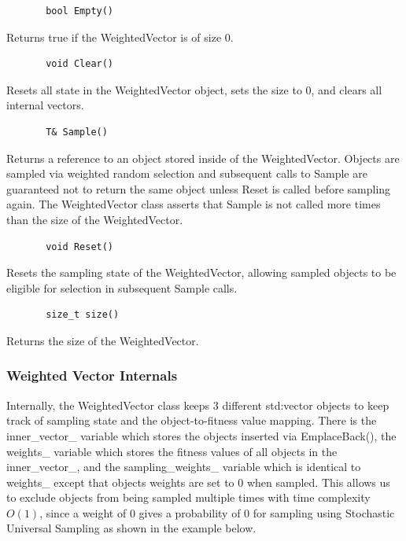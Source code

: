 \documentclass[12pt]{article}
\begin{document}
     \begin{verbatim}
       bool Empty()
     \end{verbatim}

     Returns true if the WeightedVector is of size 0.

     \begin{verbatim}
       void Clear()
     \end{verbatim}

     Resets all state in the WeightedVector object, sets the size to 0, and
     clears all internal vectors.

     \begin{verbatim}
       T& Sample()
     \end{verbatim}

     Returns a reference to an object stored inside of the WeightedVector.
     Objects are sampled via weighted random selection and subsequent calls to
     Sample are guaranteed not to return the same object unless Reset is called
     before sampling again. The WeightedVector class asserts that Sample is not
     called more times than the size of the WeightedVector.

     \begin{verbatim}
       void Reset()
     \end{verbatim}

     Resets the sampling state of the WeightedVector, allowing sampled objects
     to be eligible for selection in subsequent Sample calls.

     \begin{verbatim}
       size_t size()
     \end{verbatim}

     Returns the size of the WeightedVector.

    \subsubsection{Weighted Vector Internals}

    Internally, the WeightedVector class keeps 3 different std:vector objects
    to keep track of sampling state and the object-to-fitness value mapping.
    There is the inner\_vector\_ variable which stores the objects
    inserted via EmplaceBack(), the weights\_ variable which stores the
    fitness values of all objects in the inner\_vector\_, and the
    sampling\_weights\_ variable which is identical to weights\_
    except that objects weights are set to 0 when sampled. This allows us to
    exclude objects from being sampled multiple times with time complexity
    $O(1)$, since a weight of 0 gives a probability of 0 for sampling using
    Stochastic Universal Sampling as shown in the example below.
\end{document}
